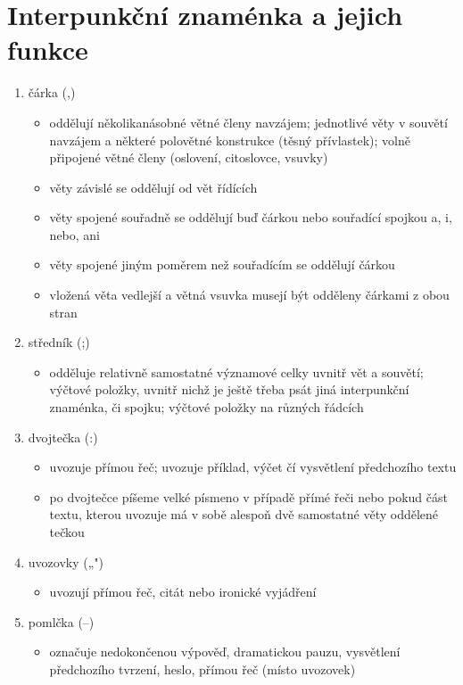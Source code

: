 \documentclass{memoir}
\begin{document}
\section*{Interpunkční znaménka a jejich funkce}
	\begin{enumerate}
		\item čárka (,)
		\begin{itemize}
			\item oddělují několikanásobné větné členy navzájem; jednotlivé věty v souvětí navzájem a některé polovětné konstrukce (těsný přívlastek); volně připojené větné členy (oslovení, citoslovce, vsuvky)
			\item věty závislé se oddělují od vět řídících
			\item věty spojené souřadně se oddělují buď čárkou nebo souřadící spojkou a, i, nebo, ani
			\item věty spojené jiným poměrem než souřadícím se oddělují čárkou
			\item vložená věta vedlejší a větná vsuvka musejí být odděleny čárkami z obou stran
		\end{itemize}
		\item středník (;)
		\begin{itemize}
			\item odděluje relativně samostatné významové celky uvnitř vět a souvětí; výčtové položky, uvnitř nichž je ještě třeba psát jiná interpunkční znaménka, či spojku; výčtové položky na různých řádcích
		\end{itemize}
		\item dvojtečka (:)
		\begin{itemize}
			\item uvozuje přímou řeč; uvozuje příklad, výčet čí vysvětlení předchozího textu
			\item po dvojtečce píšeme velké písmeno v případě přímé řeči nebo pokud část textu, kterou uvozuje má v sobě alespoň dvě samostatné věty oddělené tečkou
		\end{itemize}
		\item uvozovky („")
		\begin{itemize}
			\item uvozují přímou řeč, citát nebo ironické vyjádření
		\end{itemize}
		\item pomlčka (–)
		\begin{itemize}
			\item označuje nedokončenou výpověď, dramatickou pauzu, vysvětlení předchozího tvrzení, heslo, přímou řeč (místo uvozovek)

\end{itemize}
\end{enumerate}
\end{document}
